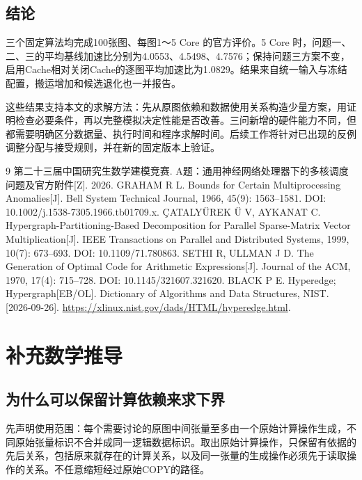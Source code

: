 \documentclass[anonymous,notoc]{gmcm2026}
\begin{document}
\subsection{结论}

三个固定算法均完成100张图、每图1～5 Core 的官方评价。5 Core 时，问题一、二、三的平均基线加速比分别为4.0553、4.5498、4.7576；保持问题三方案不变，启用Cache相对关闭Cache的逐图平均加速比为1.0829。结果来自统一输入与冻结配置，搬运增加和候选退化也一并报告。

这些结果支持本文的求解方法：先从原图依赖和数据使用关系构造少量方案，用证明检查必要条件，再以完整模拟决定性能是否改善。三问新增的硬件能力不同，但都需要明确区分数据量、执行时间和程序求解时间。后续工作将针对已出现的反例调整分配与接受规则，并在新的固定版本上验证。


\FloatBarrier
\begin{thebibliography}{9}
 第二十三届中国研究生数学建模竞赛. A题：通用神经网络处理器下的多核调度问题及官方附件[Z]. 2026.
 GRAHAM R L. Bounds for Certain Multiprocessing Anomalies[J]. Bell System Technical Journal, 1966, 45(9): 1563--1581. DOI: 10.1002/j.1538-7305.1966.tb01709.x.
 ÇATALYÜREK Ü V, AYKANAT C. Hypergraph-Partitioning-Based Decomposition for Parallel Sparse-Matrix Vector Multiplication[J]. IEEE Transactions on Parallel and Distributed Systems, 1999, 10(7): 673--693. DOI: 10.1109/71.780863.
 SETHI R, ULLMAN J D. The Generation of Optimal Code for Arithmetic Expressions[J]. Journal of the ACM, 1970, 17(4): 715--728. DOI: 10.1145/321607.321620.
 BLACK P E. Hyperedge; Hypergraph[EB/OL]. Dictionary of Algorithms and Data Structures, NIST. [2026-09-26]. \url{https://xlinux.nist.gov/dads/HTML/hyperedge.html}.
\end{thebibliography}

\appendix
\setcounter{section}{1}
\section{补充数学推导}

\subsection{为什么可以保留计算依赖来求下界}

先声明使用范围：每个需要讨论的原图中间张量至多由一个原始计算操作生成，不同原始张量标识不合并成同一逻辑数据标识。取出原始计算操作，只保留有依据的先后关系，包括原来就存在的计算关系，以及同一张量的生成操作必须先于读取操作的关系。不任意缩短经过原始COPY的路径。
\end{document}
